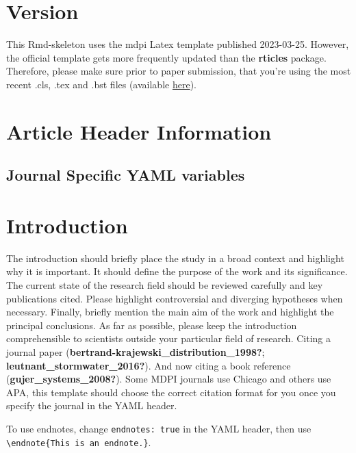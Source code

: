 \documentclass[
]{article}
\begin{document}
\hypertarget{version}{%
\section{Version}\label{version}}

This Rmd-skeleton uses the mdpi Latex template published 2023-03-25.
However, the official template gets more frequently updated than the \textbf{rticles}
package. Therefore, please make sure prior to paper submission, that you're
using the most recent .cls, .tex and .bst files
(available \href{http://www.mdpi.com/authors/latex}{here}).

\hypertarget{article-header-information}{%
\section{Article Header Information}\label{article-header-information}}

\hypertarget{journal-specific-yaml-variables}{%
\subsection{Journal Specific YAML variables}\label{journal-specific-yaml-variables}}

\hypertarget{introduction}{%
\section{Introduction}\label{introduction}}

The introduction should briefly place the study in a broad context and highlight
why it is important. It should define the purpose of the work and its
significance. The current state of the research field should be reviewed
carefully and key publications cited. Please highlight controversial and
diverging hypotheses when necessary. Finally, briefly mention the main aim of
the work and highlight the principal conclusions. As far as possible, please
keep the introduction comprehensible to scientists outside your particular
field of research. Citing a journal paper (\textbf{bertrand-krajewski\_distribution\_1998?}; \textbf{leutnant\_stormwater\_2016?}). And now citing a book reference (\textbf{gujer\_systems\_2008?}).
Some MDPI journals use Chicago and others use APA, this template should choose
the correct citation format for you once you specify the journal in the YAML
header.

To use endnotes, change \texttt{endnotes:\ true} in the YAML header, then use
\texttt{\textbackslash{}endnote\{This\ is\ an\ endnote.\}}.
\end{document}
